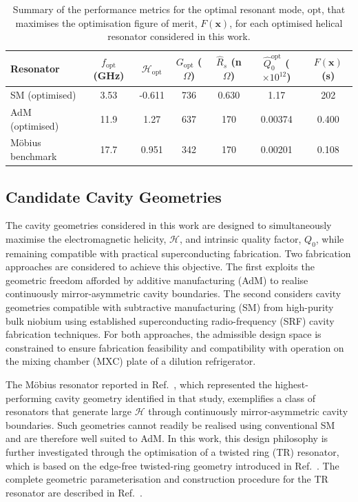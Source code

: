 \documentclass[
  aps,
  physrev,
  reprint,
  superscriptaddress,
  nofootinbib,
  amsmath,
  amssymb
]{revtex4-2}
\begin{document}
\begin{table}[!t]
    \caption{Summary of the performance metrics for the optimal resonant mode, $\mathrm{opt}$, that maximises the optimisation figure of merit, $F(\mathbf{x})$, for each optimised helical resonator considered in this work. }
    \label{tab:FoM_summary}
    \begin{ruledtabular}
        \begin{tabular}{lcccccc}
            \textbf{Resonator} &
            \textbf{$f_{\mathrm{opt}}$ (GHz)} &
            \textbf{$\mathscr{H}_{\mathrm{opt}}$} &
            \textbf{$G_{\mathrm{opt}}$ ($\Omega$)} &
            \textbf{$\hat R_s$ (n$\Omega$)} &
            \textbf{$\hat{Q}_0^{\mathrm{opt}}$ ($\times 10^{12}$)} &
            \textbf{$F(\mathbf{x})$ (s)} \\
            \hline
            SM (optimised) & 3.53 & -0.611 & 736 & 0.630 & 1.17 & 202 \\
            AdM (optimised) & 11.9 & 1.27 & 637 & 170 & 0.00374 & 0.400 \\
            M\"obius benchmark & 17.7 & 0.951 & 342 & 170 & 0.00201 & 0.108 \\
        \end{tabular}
    \end{ruledtabular}
\end{table}

\subsection{Candidate Cavity Geometries}
\label{sec:cavity_geometries}

The cavity geometries considered in this work are designed to simultaneously maximise the electromagnetic helicity, $\mathscr H$, and intrinsic quality factor, $Q_0$, while remaining compatible with practical superconducting fabrication. Two fabrication approaches are considered to achieve this objective. The first exploits the geometric freedom afforded by additive manufacturing (AdM) to realise continuously mirror-asymmetric cavity boundaries. The second considers cavity geometries compatible with subtractive manufacturing (SM) from high-purity bulk niobium using established superconducting radio-frequency (SRF) cavity fabrication techniques. For both approaches, the admissible design space is constrained to ensure fabrication feasibility and compatibility with operation on the mixing chamber (MXC) plate of a dilution refrigerator.

The M\"obius resonator reported in Ref.~\cite{Bourhill2023}, which represented the highest-performing cavity geometry identified in that study, exemplifies a class of resonators that generate large $\mathscr H$ through continuously mirror-asymmetric cavity boundaries. Such geometries cannot readily be realised using conventional SM and are therefore well suited to AdM. In this work, this design philosophy is further investigated through the optimisation of a twisted ring (TR) resonator, which is based on the edge-free twisted-ring geometry introduced in Ref.~\cite{Paterson2026InverseDesign}. The complete geometric parameterisation and construction procedure for the TR resonator are described in Ref.~\cite{Paterson2026InverseDesign}.
\end{document}
